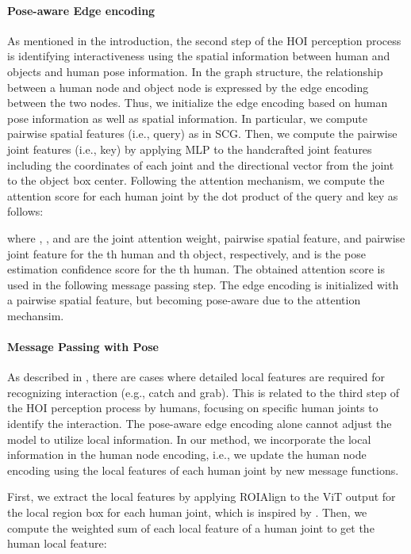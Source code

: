\documentclass[10pt,twocolumn,letterpaper]{article}
\begin{document}
 \paragraph{Pose-aware Edge encoding}
 As mentioned in the introduction, the second step of the HOI perception process is identifying interactiveness using the spatial information between human and objects and human pose information. In the graph structure, the relationship between a human node and object node is expressed by the edge encoding between the two nodes. Thus, we initialize the edge encoding based on human pose information as well as spatial information. In particular, we compute pairwise spatial features (i.e., query) as in SCG. Then, we compute the pairwise joint features (i.e., key) by applying MLP to the handcrafted joint features including the coordinates of each joint and the directional vector from the joint to the object box center. Following the attention mechanism, we compute the attention score for each human joint by the dot product of the query and key as follows:


where , , and  are the joint attention weight, pairwise spatial feature, and pairwise joint feature for the th human and th object, respectively, and  is the pose estimation confidence score for the th human. The obtained attention score is used in the following message passing step. The edge encoding is initialized with a pairwise spatial feature, but becoming pose-aware due to the attention mechansim. 



\paragraph {Message Passing with Pose}
As described in \cite{wan2019pose}, there are cases where detailed local features are required for recognizing interaction (e.g., catch and grab). This is related to the third step of the HOI perception process by humans, focusing on specific human joints to identify the interaction. The pose-aware edge encoding alone cannot adjust the model to utilize local information. In our method, we incorporate the local information in the human node encoding, i.e., we update the human node encoding using the local features of each human joint by new message functions. 

First, we extract the local features by applying ROIAlign to the ViT output for the local region box for each human joint, which is inspired by \cite{wan2019pose}. Then, we compute the weighted sum of each local feature of a human joint to get the human local feature:
\end{document}
